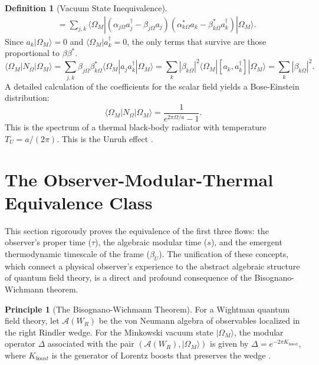 \documentclass[11pt, letterpaper]{report}
\theoremstyle{plain} %
\theoremstyle{definition} %
\newtheorem{definition}{Definition}[chapter]
\newtheorem{principle}{Principle}[chapter]
\theoremstyle{remark} %
\begin{document}
\begin{definition}[Vacuum State Inequivalence]
\begin{align}
    &= \sum_{j,k} \langle \Omega_M | (\alpha_{j\Omega} a_j^\dagger - \beta_{j\Omega} a_j) (\alpha_{k\Omega}^* a_k - \beta_{k\Omega}^* a_k^\dagger) | \Omega_M \rangle.
\end{align}
Since $a_k |\Omega_M\rangle = 0$ and $\langle \Omega_M | a_k^\dagger = 0$, the only terms that survive are those proportional to $\beta\beta^*$.
\begin{equation}
    \langle \Omega_M | N_\Omega | \Omega_M \rangle = \sum_{j,k} \beta_{j\Omega} \beta_{k\Omega}^* \langle \Omega_M | a_j a_k^\dagger | \Omega_M \rangle = \sum_k |\beta_{k\Omega}|^2 \langle \Omega_M | [a_k, a_k^\dagger] | \Omega_M \rangle = \sum_k |\beta_{k\Omega}|^2.
\end{equation}
A detailed calculation of the coefficients for the scalar field yields a Bose-Einstein distribution:
\begin{equation}
    \langle \Omega_M | N_\Omega | \Omega_M \rangle = \frac{1}{e^{2\pi\Omega/a} - 1}.
    \label{eq:bose_einstein_unruh}
\end{equation}
This is the spectrum of a thermal black-body radiator with temperature $T_U = a/(2\pi)$. This is the Unruh effect \cite{Unruh1976, Davies1975}.
\end{definition}



\section{The Observer-Modular-Thermal Equivalence Class}
\label{sec:observer_class_final}
This section rigorously proves the equivalence of the first three flows: the observer's proper time ($\tau$), the algebraic modular time ($s$), and the emergent thermodynamic timescale of the frame ($\beta_U$). The unification of these concepts, which connect a physical observer's experience to the abstract algebraic structure of quantum field theory, is a direct and profound consequence of the Bisognano-Wichmann theorem.

\begin{principle}[The Bisognano-Wichmann Theorem]
\label{principle:bisognano_wichmann_final}
For a Wightman quantum field theory, let $\mathcal{A}(W_R)$ be the von Neumann algebra of observables localized in the right Rindler wedge. For the Minkowski vacuum state $|\Omega_M\rangle$, the modular operator $\Delta$ associated with the pair $(\mathcal{A}(W_R), |\Omega_M\rangle)$ is given by $\Delta = e^{-2\pi K_{boost}}$, where $K_{boost}$ is the generator of Lorentz boosts that preserves the wedge \cite{BisognanoWichmann1975, Haag1996}.
\end{principle}
\end{document}
